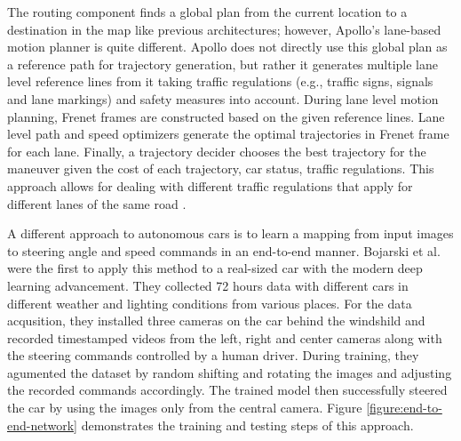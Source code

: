 The routing component finds a global plan from the current location
to a destination in the map like previous architectures; however, Apollo's
lane-based motion planner is quite different. Apollo does not directly use
this global plan as a reference path for trajectory generation, but rather it
generates multiple lane level reference lines from it taking traffic
regulations (e.g., traffic signs, signals and lane markings) and safety
measures into account.  During lane level motion planning, Frenet frames are
constructed based on the given reference lines.  Lane level path and speed
optimizers generate the optimal trajectories in Frenet frame for each lane.
Finally, a trajectory decider chooses the best trajectory for the maneuver
given the cost of each trajectory, car status, traffic regulations.  This
approach allows for dealing with different traffic regulations that apply for
different lanes of the same road \cite{Fan2018BaiduAE}.

A different approach to autonomous cars is to learn a mapping from input images
to steering angle and speed commands in an end-to-end manner. Bojarski et al.
\cite{Bojarski2016EndTE} were the first to apply this method to a real-sized
car with the modern deep learning advancement. They collected 72 hours data
with different cars in different weather and lighting conditions from various
places. For the data acqusition, they installed three cameras on the car behind
the windshild and recorded timestamped videos from the left, right and center
cameras along with the steering commands controlled by a human driver. During
training, they agumented the dataset by random shifting and rotating the images
and adjusting the recorded commands accordingly. The trained model then
successfully steered the car by using the images only from the central camera.
Figure \ref{figure:end-to-end-network} demonstrates the training and testing
steps of this approach.

